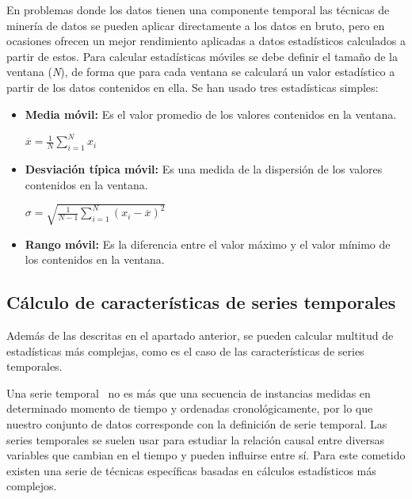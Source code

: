 En problemas donde los datos tienen una componente temporal las técnicas de minería de datos se pueden aplicar directamente a los datos en bruto, pero en ocasiones ofrecen un mejor rendimiento aplicadas a datos estadísticos calculados a partir de estos. Para calcular estadísticas móviles se debe definir el tamaño de la ventana (\textit{N}), de forma que para cada ventana se calculará un valor estadístico a partir de los datos contenidos en ella. Se han usado tres estadísticas simples: 

\begin{minipage}{\linewidth}
\begin{itemize}
	\item \textbf{Media móvil:} Es el valor promedio de los valores contenidos en la ventana. 
	\begin{center}
		$ \overline{x}=\frac{1}{N}\sum_{i=1}^{N}x_{i}$
	\end{center}
	\item \textbf{Desviación típica móvil:} Es una medida de la dispersión de los valores contenidos en la ventana. 
	\begin{center}
		$ \sigma=\sqrt{\frac{1}{N-1}\sum_{i=1}^{N}(x_{i}-\overline{x})^2}$
	\end{center}
	\item \textbf{Rango móvil:} Es la diferencia entre el valor máximo y el valor mínimo de los contenidos en la ventana. 
\end{itemize}
\end{minipage}

\subsection{Cálculo de características de series temporales}

Además de las descritas en el apartado anterior, se pueden calcular multitud de estadísticas más complejas, como es el caso de las características de series temporales. 

Una serie temporal~\cite{wiki:serietemporal} no es más que una secuencia de instancias medidas en determinado momento de tiempo y ordenadas cronológicamente, por lo que nuestro conjunto de datos corresponde con la definición de serie temporal. Las series temporales se suelen usar para estudiar la relación causal entre diversas variables que cambian en el tiempo y pueden influirse entre sí. Para este cometido existen una serie de técnicas específicas basadas en cálculos estadísticos más complejos. 

